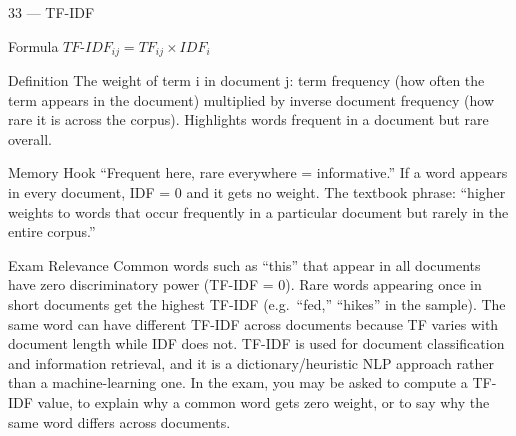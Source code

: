 \documentclass[aspectratio=169,8pt]{beamer}
\begin{document}
	\begin{frame}{33 --- TF-IDF}
		\begin{block}{Formula}
			$TF\text{-}IDF_{ij} = TF_{ij} \times IDF_i$
		\end{block}
		\begin{block}{Definition}
			The weight of term i in document j: term frequency (how often the term appears in the document) multiplied by inverse document frequency (how rare it is across the corpus). Highlights words frequent in a document but rare overall.
		\end{block}
		\begin{block}{Memory Hook}
			``Frequent here, rare everywhere = informative.'' If a word appears in every document, IDF = 0 and it gets no weight. The textbook phrase: ``higher weights to words that occur frequently in a particular document but rarely in the entire corpus.''
		\end{block}
		\begin{block}{Exam Relevance}
			Common words such as ``this'' that appear in all documents have zero discriminatory power (TF-IDF = 0). Rare words appearing once in short documents get the highest TF-IDF (e.g.\ ``fed,'' ``hikes'' in the sample). The same word can have different TF-IDF across documents because TF varies with document length while IDF does not. TF-IDF is used for document classification and information retrieval, and it is a dictionary/heuristic NLP approach rather than a machine-learning one. In the exam, you may be asked to compute a TF-IDF value, to explain why a common word gets zero weight, or to say why the same word differs across documents.
		\end{block}
	\end{frame}
	
\end{document}
